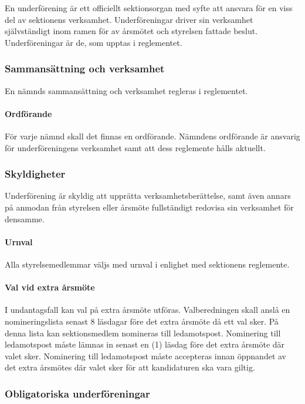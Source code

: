 \documentclass{../resources/dgovdoc}
\begin{document}
En underförening är ett officiellt sektionsorgan med syfte att ansvara för en viss del
av sektionens verksamhet. Underföreningar driver sin verksamhet självständigt inom
ramen för av årsmötet och styrelsen fattade beslut. Underföreningar är de, som upptas i
reglementet.

\subsubsection{Sammansättning och verksamhet}

En nämnds sammansättning och verksamhet regleras i reglementet.

\paragraph{Ordförande}

För varje nämnd skall det finnas en ordförande.
Nämndens ordförande är ansvarig för underföreningens verksamhet samt att dess
reglemente hålls aktuellt.

\subsubsection{Skyldigheter}

Underförening är skyldig att upprätta verksamhetsberättelse, samt även annars på
anmodan från styrelsen eller årsmöte fullständigt redovisa sin verksamhet för
densamme.

\paragraph{Urnval}

Alla styrelsemedlemmar väljs med urnval i enlighet med sektionens
reglemente.

\paragraph{Val vid extra årsmöte}

I undantagsfall kan val på extra årsmöte utföras. Valberedningen skall anslå
en nomineringslista senast 8 läsdagar före det extra årsmöte då ett val sker. På denna lista
kan sektionsmedlem nomineras till ledamotspost. Nominering till ledamotspost
måste lämnas in senast en (1) läsdag före det extra årsmöte där valet sker. Nominering till
ledamotspost måste accepteras innan öppnandet av det extra årsmötes där valet sker för
att kandidaturen ska vara giltig.

\subsubsection{Obligatoriska underföreningar}
\end{document}
